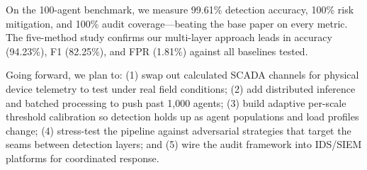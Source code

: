 \documentclass[conference]{IEEEtran}
\begin{document}
On the 100-agent benchmark, we measure 99.61\% detection accuracy, 100\% risk mitigation, and 100\% audit coverage---beating the base paper on every metric. The five-method study confirms our multi-layer approach leads in accuracy (94.23\%), F1 (82.25\%), and FPR (1.81\%) against all baselines tested.

Going forward, we plan to: (1) swap out calculated SCADA channels for physical device telemetry to test under real field conditions; (2) add distributed inference and batched processing to push past 1{,}000 agents; (3) build adaptive per-scale threshold calibration so detection holds up as agent populations and load profiles change; (4) stress-test the pipeline against adversarial strategies that target the seams between detection layers; and (5) wire the audit framework into IDS/SIEM platforms for coordinated response.
\end{document}
